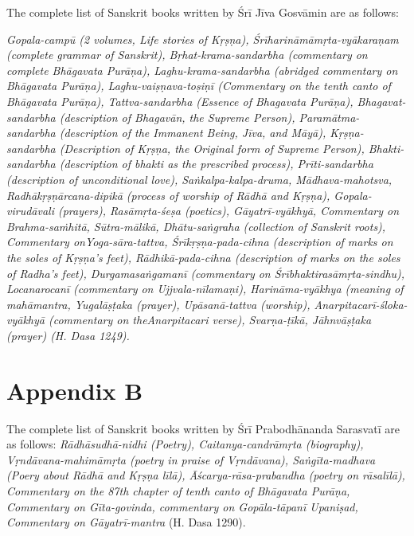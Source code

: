The complete list of Sanskrit books written by Śrī Jīva Gosvāmin are as follows: {\sl  Gopala-campū {\rm (2 volumes, Life stories of Kṛṣṇa)}, Śrīharināmā\-mṛta-vyākaraṇam {\rm (complete grammar of Sanskrit)}, Bṛhat-krama-sanda\-rbha {\rm (commentary on complete Bhāgavata Purāṇa)}, Laghu-krama-\Break sandarbha {\rm (abridged commentary on Bhāgavata Purāṇa)}, Laghu-vai\-ṣṇa\-va-toṣiṇī {\rm (Commentary on the tenth canto of Bhāgavata Purāṇa)}, Tattva-sandarbha {\rm (Essence of Bhagavata Purāṇa)}, Bhagavat-sandarbha {\rm (description of Bhagavān, the Supreme Person)}, Paramātma-sandarbha {\rm (description of the Immanent Being, Jīva, and Māyā)}, Kṛṣṇa-sandarbha {\rm (Description of Kṛṣṇa, the Original form of Supreme Person)}, Bhakti-sandarbha {\rm (description of bhakti as the prescribed process)}, Prīti-sandarbha {\rm (description of unconditional love)}, Saṅkalpa-kalpa-druma, Mādhava-maho\-tsva, Radhākṛṣṇārcana-dipikā {\rm (process of worship of Rādhā and Kṛṣṇa)}, Gopala-virudāvali {\rm (prayers)}, Rasāmṛta-śeṣa {\rm (poetics)}, Gāyatrī-vyākhyā, Commentary on Brahma-saṁhitā, Sūtra-mālikā, Dhātu-saṅgraha {\rm (collection of Sanskrit roots)}, Commentary on\break Yoga-sāra-tattva, Śrīkṛṣṇa-pada-cihna {\rm (description of marks on the soles of Kṛṣṇa’s feet)}, Rādhikā-pada-cihna {\rm (description of marks on the soles of Radha’s feet)}, Durgamasaṅgamanī {\rm (commentary on Śrībhaktirasāmṛ\-ta-sindhu)}, Locanarocanī {\rm (commentary on Ujjvala-nīlamaṇi)}, Harināma-vyākhya {\rm (meaning of mahāmantra, Yugalāṣṭaka {\rm (prayer)}, Upāsanā-\Break tattva {\rm (worship)}, Anarpitacarī-śloka-vyākhyā {\rm (commentary on the\break Anarpitacari verse)}, Svarṇa-ṭīkā, Jāhnvāṣṭaka {\rm (prayer)} {\rm (H. Dasa 1249)}.} 
\newpage

\section*{Appendix B}
\vskip -10pt

The complete list of Sanskrit books written by Śrī Prabodhānanda Sarasvatī are as follows: {\sl Rādhāsudhā-nidhi {\rm (Poetry)}, Caitanya-candrāmṛta {\rm (biography)}, Vṛndāvana-mahimāmṛta {\rm (poetry in praise of Vṛndāvana)}, Saṅgīta-madhava {\rm (Poery about Rādhā and Kṛṣṇa līlā)}, Āścarya-rāsa-prabandha {\rm (poetry on rāsalīlā)}, Commentary on the 87th chapter of tenth canto of Bhāgavata Purāṇa, Commentary on Gīta-govinda, commentary on Gopāla-\Break tāpanī Upaniṣad, Commentary on Gāyatrī-mantra} {\rm (H. Dasa 1290)}. 

}
